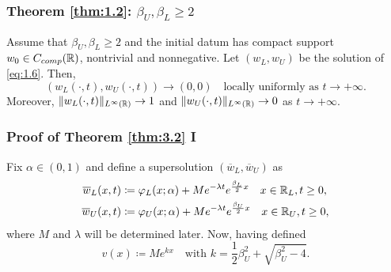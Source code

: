 
\begin{frame}
    \frametitle{Theorem \ref{thm:1.2}: \texorpdfstring{\(\beta_U, \beta_L\geq 2\)}{betaU, betaL >= 2}}
    \begin{theorem}
        Assume that \(\beta_U, \beta_L \geq 2\) and the initial datum has compact support \(w_{0} \in C_{comp}(\mathbb{R})\), nontrivial and nonnegative. Let \((w_L, w_{U})\) be the solution of \eqref{eq:1.6}. Then,
        \[
            (w_L(\cdot, t), w_{U}(\cdot, t)) \to (0, 0) \quad \text{locally uniformly as } t \to +\infty.
        \]
        Moreover, \(\lVert w_L(\cdot, t)\rVert_{L^{\infty}(\mathbb{R})} \to 1\) and \(\lVert w_U(\cdot, t)\rVert_{L^{\infty}(\mathbb{R})} \to 0\) as \(t \to +\infty\).
        \label{thm:3.2}
    \end{theorem}
\end{frame}


\begin{frame}
    \frametitle{Proof of Theorem \ref{thm:3.2} I}
    \begin{proofs}
        Fix \(\alpha \in (0, 1)\) and define a supersolution \((\overline{w}_L, \overline{w}_U)\) as
        \begin{align*}
            \overline{w}_L(x, t) & \coloneqq \varphi_L(x; \alpha) + M e^{-\lambda t} e^{\frac{\beta_L}{2}x} \quad x \in \mathbb{R}_L, t \geq 0, \\
            \overline{w}_U(x, t) & \coloneqq \varphi_U(x; \alpha) + M e^{-\lambda t} e^{\frac{\beta_U}{2}x} \quad x \in \mathbb{R}_U, t \geq 0,
        \end{align*}
        where \(M\) and \(\lambda\) will be determined later. Now, having defined 
        \[
            v(x) \coloneqq M e^{kx} \quad \text{with } k = \frac{1}{2}\beta_U^2 + \sqrt{\beta_U^2 - 4}.
        \]
        
    \end{proofs}
\end{frame}


